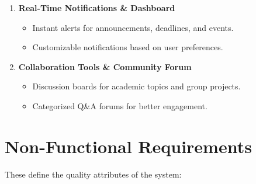 \begin{enumerate}
    \item \textbf{Real-Time Notifications \& Dashboard}
    \begin{itemize}
        \item Instant alerts for announcements, deadlines, and events.
        \item Customizable notifications based on user preferences.
    \end{itemize}

    \item \textbf{Collaboration Tools \& Community Forum}
    \begin{itemize}
        \item Discussion boards for academic topics and group projects.
        \item Categorized Q\&A forums for better engagement.
    \end{itemize}
\end{enumerate}

\section{Non-Functional Requirements}

These define the quality attributes of the system:

